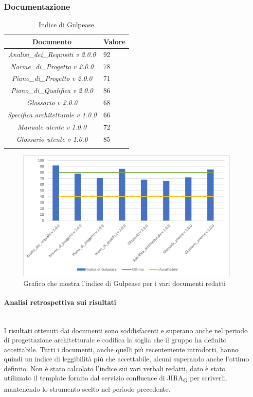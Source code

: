 \subsubsection{Documentazione}
\begin{table}[H]
	\centering
	\setlength\extrarowheight{5pt}
	\renewcommand\tabularxcolumn[1]{>{\Centering}m{#1}}
	\begin{tabularx}{\textwidth}{| c | X |} 
		\hline
		\rowcolor{white}
		\textbf{Documento} & \textbf{Valore}\\
		\hline
		\textit{Analisi\_dei\_Requisiti v 2.0.0} & 92 \\
		\hline
		\textit{Norme\_di\_Progetto v 2.0.0} & 78\\
		\hline
		\textit{Piano\_di\_Progetto v 2.0.0} & 71\\
		\hline
		\textit{Piano\_di\_Qualifica v 2.0.0} & 86\\
		\hline
		\textit{Glossario v 2.0.0} & 68\\
        \hline
		\textit{Specifica architetturale v 1.0.0} & 66\\
        \hline
		\textit{Manuale utente v 1.0.0} & 72\\
         \hline
		\textit{Glossario utente v 1.0.0} & 85\\
		\hline
		\rowcolor{white}
		\caption{Indice di Gulpease}
	\end{tabularx}
\end{table}
\begin{figure}[H]
	\centering
	\includegraphics[scale=0.9]{img/Gulpease2.png}
	\caption{Grafico che mostra l'indice di Gulpease per i vari documenti redatti}
\end{figure}
\paragraph{Analisi retrospettiva sui risultati}\mbox{}\\
I risultati ottenuti dai documenti sono soddisfacenti e superano anche nel periodo di progettazione architetturale e codifica la soglia che il gruppo ha definito accettabile. Tutti i documenti, anche quelli più recentemente introdotti, hanno quindi un indice di leggibilità più che accettabile, alcuni superando anche l'ottimo definito. Non è stato calcolato l'indice sui vari verbali redatti, dato è stato utilizzato il template fornito dal servizio confluence di JIRA\textsubscript{G} per scriverli, mantenendo lo strumento scelto nel periodo precedente.
